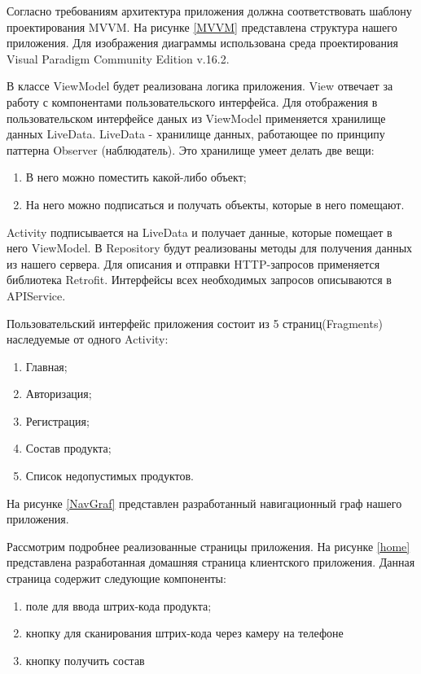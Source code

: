 Согласно требованиям архитектура приложения должна соответствовать шаблону проектирования MVVM\cite{8}. На рисунке \ref{MVVM} представлена структура нашего приложения. Для изображения диаграммы использована среда проектирования Visual Paradigm Community Edition v.16.2.


В классе ViewModel будет реализована логика приложения. View отвечает за работу с компонентами пользовательского интерфейса. Для отображения в пользовательском интерфейсе даных из ViewModel применяется хранилище данных LiveData\cite{9}.
LiveData - хранилище данных, работающее по принципу паттерна Observer (наблюдатель). Это хранилище умеет делать две вещи:
\begin{enumerate}
	\item В него можно поместить какой-либо объект;
	\item На него можно подписаться и получать объекты, которые в него помещают.
\end{enumerate}

Activity подписывается на LiveData и получает данные, которые помещает в него ViewModel. В Repository будут реализованы методы для получения данных из нашего сервера. Для описания и отправки HTTP-запросов применяется библиотека Retrofit\cite{10}. Интерфейсы всех необходимых запросов описываются в APIService.

Пользовательский интерфейс приложения состоит из 5 страниц(Fragments) наследуемые от одного Activity:
\newline
\begin{enumerate}
	\item Главная;
	\item Авторизация;
	\item Регистрация;
	\item Состав продукта;
	\item Список недопустимых продуктов.
\end{enumerate}

На рисунке \ref{NavGraf} представлен разработанный навигационный граф нашего приложения.


Рассмотрим подробнее реализованные страницы приложения. На рисунке \ref{home} представлена разработанная домашняя страница клиентского приложения. Данная страница содержит следующие компоненты:
\newline
\begin{enumerate}
	\item поле для ввода штрих-кода продукта;
	\item кнопку для сканирования штрих-кода через камеру на телефоне
	\item кнопку получить состав
\end{enumerate}

